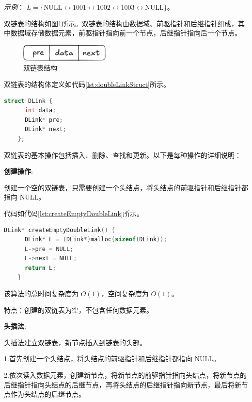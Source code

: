 \documentclass[lang=cn,newtx,10pt,scheme=chinese]{../elegantbook}
\begin{document}
  \textit{示例}：
  $L = \{\text{NULL} \leftrightarrow 1001 \leftrightarrow 1002 \leftrightarrow 1003 \leftrightarrow \text{NULL}\}$。

  双链表的结构如图\ref{fig:doubleLinkStruct}所示。双链表的结构由数据域、前驱指针和后继指针组成，其中数据域存储数据元素，前驱指针指向前一个节点，后继指针指向后一个节点。
  \begin{figure}[!htbp]
    \centering
    \includegraphics[width=0.4\textwidth]{./figure/pdf/cropped/doubleLinkStruct.pdf}
    \caption{双链表结构}
    \label{fig:doubleLinkStruct}
  \end{figure}

  双链表的结构体定义如代码\ref{lst:doubleLinkStruct}所示。
  \begin{lstlisting}[language=C++, caption={双链表结构体定义}, label={lst:doubleLinkStruct}]
    struct DLink {
      int data;
      DLink* pre;
      DLink* next;
    };
  \end{lstlisting}

  双链表的基本操作包括插入、删除、查找和更新。以下是每种操作的详细说明：

  \textbf{创建操作}:

  创建一个空的双链表，只需要创建一个头结点，将头结点的前驱指针和后继指针都指向 NULL。

  代码如代码\ref{lst:createEmptyDoubleLink}所示。
  \begin{lstlisting}[language=C++, caption={创建一个空双链表示例代码}, label={lst:createEmptyDoubleLink}]
    DLink* createEmptyDoubleLink() {
      DLink* L = (DLink*)malloc(sizeof(DLink));
      L->pre = NULL;
      L->next = NULL;
      return L;
    }
  \end{lstlisting}
  该算法的总时间复杂度为 $O(1)$，空间复杂度为 $O(1)$。

  特点：创建的双链表为空，不包含任何数据元素。

  \textbf{头插法}:

  头插法建立双链表，新节点插入到链表的头部。

  1.首先创建一个头结点，将头结点的前驱指针和后继指针都指向 NULL。

  2.依次读入数据元素，创建新节点，将新节点的前驱指针指向头结点，将新节点的后继指针指向头结点的后继节点，再将头结点的后继指针指向新节点，最后将新节点作为头结点的后继节点。
\end{document}
